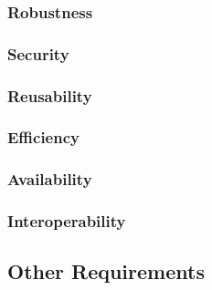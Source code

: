 \documentclass[english]{article}
\begin{document}
    				
				\subsubsection{Robustness}
    		
    				
				\subsubsection{Security}
    			
    				
				\subsubsection{Reusability}
	
				    
				\subsubsection{Efficiency}
				  
				\subsubsection{Availability}
				 
	
				\subsubsection{Interoperability}
				

				\subsection{Other Requirements}
				

	
\end{document}
